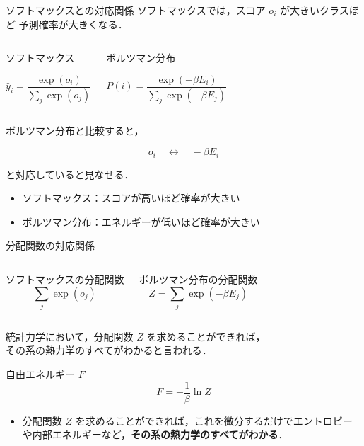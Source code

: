 \documentclass[dvipdfmx,uplatex,11pt]{beamer}
\begin{document}
\begin{frame}{ソフトマックスとの対応関係}
ソフトマックスでは，スコア $o_i$ が大きいクラスほど
予測確率が大きくなる．

\begin{columns}[T]
\begin{block}{ソフトマックス}

\[
\hat{y}_i
=
\frac{\exp(o_i)}
{\sum_j \exp(o_j)}
\]
\end{block}

\begin{block}{ボルツマン分布}

\[
P(i)
=
\frac{\exp\left(- \beta E_i\right)}
{\sum_j \exp\left(- \beta E_j\right)}
\]
\end{block}
\end{columns}

ボルツマン分布と比較すると，

\[
o_i
\quad \leftrightarrow \quad
-\beta E_i
\]

と対応していると見なせる．
\begin{itemize}
  \item ソフトマックス：スコアが高いほど確率が大きい
  \item ボルツマン分布：エネルギーが低いほど確率が大きい
\end{itemize}
\end{frame}

\begin{frame}{分配関数の対応関係}
\begin{columns}
\begin{block}{ソフトマックスの分配関数}
\[
\sum_j \exp(o_j)
\]
\end{block}
\begin{block}{ボルツマン分布の分配関数}
\[
Z
=
\sum_j \exp\left(- \beta E_j\right)
\]
\end{block}
\end{columns}

統計力学において，分配関数 $Z$ を求めることができれば，\\
その系の熱力学のすべてがわかると言われる．
\vspace{1em}

    \begin{block}{自由エネルギー $F$}
        \[
            F = -\frac{1}{\beta} \ln Z
        \]
    \end{block}

    \begin{itemize}
        \item 分配関数 $Z$ を求めることができれば，これを微分するだけでエントロピーや内部エネルギーなど，\textbf{その系の熱力学のすべてがわかる}．
    \end{itemize}
\end{frame}
\end{document}
